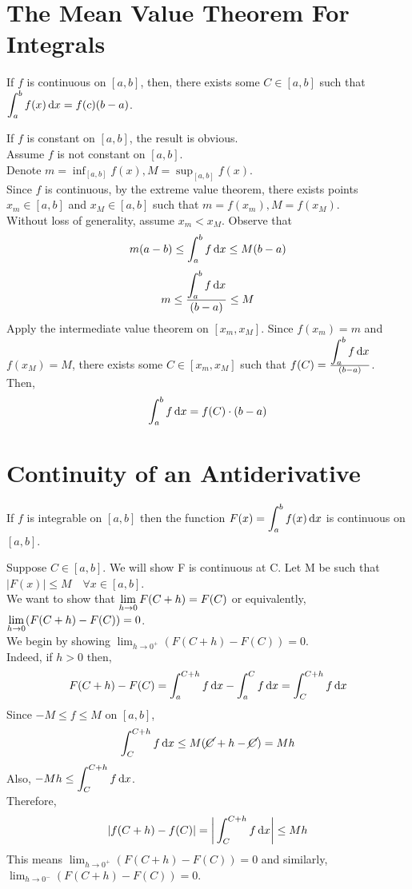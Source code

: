\documentclass[12pt]{article}
\begin{document}
\section{The Mean Value Theorem For Integrals}
\begin{theo}{}
If \(f\) is continuous on \([a, b]\), then, there exists some \(C \in [a, b]\) such that \(\displaystyle\int_a^b f(x) \,\mathrm{d} x = f(c)(b-a)\).    
\end{theo}
\newpage
\begin{prf}{}
If \(f\) is constant on \([a, b]\), the result is obvious.\\
Assume \(f\) is not constant on \([a, b]\).\\
Denote \(m  = \displaystyle\inf_{[a, b]}f(x), M = \displaystyle\sup_{[a, b]}f(x)\).\\
Since \(f\) is continuous, by the extreme value theorem, there exists points \(x_m \in [a, b]\) and \(x_M \in [a, b]\) such that \(m = f(x_m), M = f(x_M)\).\\
Without loss of generality, assume \(x_m < x_M\). Observe that 
\[m(a-b) \le \displaystyle\int_a^b f\,\mathrm{d} x \le M(b-a)\]
\[m \le \frac{\displaystyle\int_a^b f\,\mathrm{d} x}{(b - a)} \le M\]
Apply the intermediate value theorem on \([x_m, x_M]\). Since \(f(x_m) = m\) and \(f(x_M) = M\), there exists some \(C \in [x_m, x_M]\) such that \(f(C) = \frac{\displaystyle\int_a^b f\,\mathrm{d} x}{(b-a)}\).\\
Then, \[\displaystyle\int_a^b f\,\mathrm{d} x = f(C)\cdot (b - a)\]
\end{prf}

\section{Continuity of an Antiderivative}
\begin{theo}{}
If \(f\) is integrable on \([a, b]\) then the function \(F(x) = \displaystyle\int_a^b f(x) \,\mathrm{d} x\) is continuous on \([a, b]\).   
\end{theo}
\newpage
\begin{prf}{}
Suppose \(C \in [a, b]\). We will show F is continuous at C. Let M be such that \(|F(x)| \le M \quad \forall x \in [a, b]\).\\
We want to show that \(\displaystyle\lim_{h\to 0} F(C+h) = F(C)\) or equivalently, \(\displaystyle\lim_{h\to 0} (F(C+h) - F(C)) = 0\).\\
We begin by showing \(\lim_{h\to 0^+}(F(C+h) - F(C)) = 0\).\\
Indeed, if \(h > 0\) then, \[F(C+h) - F(C) = \displaystyle\int_a^{C+h} f\,\mathrm{d} x - \displaystyle\int_a^C f \,\mathrm{d} x = \displaystyle\int_C^{C+h} f \,\mathrm{d} x\]
Since \(-M \le f \le M\) on \([a, b]\),
\[\displaystyle\int_C^{C+h} f\,\mathrm{d} x \le M(\cancel{C}+ h - \cancel{C}) = Mh\]
Also, \(-Mh \le \displaystyle\int_C^{C+h}f\,\mathrm{d} x\).\\
Therefore, \[|f(C+h)-f(C)| = \bigg\vert\displaystyle\int_C^{C+h} f\,\mathrm{d} x\bigg\vert \le Mh\]
This means \(\lim_{h\to 0^+}(F(C+h) - F(C)) = 0\) and similarly, \(\lim_{h\to 0^-}(F(C+h) - F(C)) = 0\).\\
\end{prf}
\end{document}
